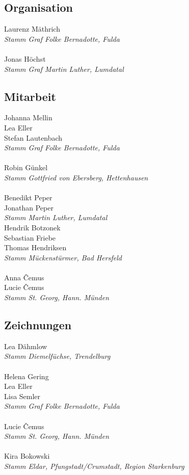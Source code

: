 \begin{centering}
\begin{multicols}{2}

\subsection*{Organisation}
Laurenz Mäthrich \\ \textit{Stamm Graf Folke Bernadotte, Fulda} \\ ~\\
Jonas Höchst \\ \textit{Stamm Graf Martin Luther, Lumdatal} \\

\subsection*{Mitarbeit}
Johanna Mellin \\ Lea Eller \\ Stefan Lautenbach \\ \textit{Stamm Graf Folke Bernadotte, Fulda} \\ ~\\
Robin Günkel \\ \textit{Stamm Gottfried von Ebersberg, Hettenhausen} \\ ~\\
Benedikt Peper \\ Jonathan Peper \\ \textit{Stamm Martin Luther, Lumdatal} \\
Hendrik Botzonek \\ Sebastian Friebe \\ Thomas Hendriksen \\ \textit{Stamm Mückenstürmer, Bad Hersfeld} \\ ~\\
Anna \v{C}emus \\ Lucie \v{C}emus \\ \textit{Stamm St. Georg, Hann. Münden} \\

\subsection*{Zeichnungen}
Lea Dähmlow \\ \textit{Stamm Diemelfüchse, Trendelburg} \\ ~\\
Helena Gering \\ Lea Eller \\ Lisa Semler \\ \textit{Stamm Graf Folke Bernadotte, Fulda} \\ ~\\
Lucie \v{C}emus \\ \textit{Stamm St. Georg, Hann. Münden} \\ ~\\
Kira Bokowski \\ \textit{Stamm Eldar, Pfungstadt/Crumstadt, Region Starkenburg} \\


\end{multicols}
\end{centering}
